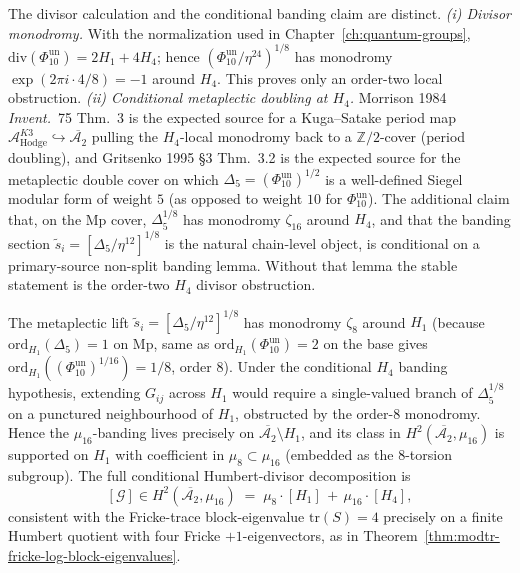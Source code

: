 \begin{remark}
\label{rem:modtr-mu16-why-mu8-fails}
The divisor calculation and the conditional banding claim are distinct.
\emph{(i) Divisor monodromy.} With the normalization used in
Chapter~\ref{ch:quantum-groups},
$\mathrm{div}(\Phi_{10}^{\mathrm{un}})=2H_1+4H_4$; hence
$(\Phi_{10}^{\mathrm{un}}/\eta^{24})^{1/8}$ has monodromy
$\exp(2\pi i\cdot4/8)=-1$ around $H_4$. This proves only an order-two
local obstruction.
\emph{(ii) Conditional metaplectic doubling at $H_4$.}
Morrison 1984 \emph{Invent.}~75 Thm.~3 is the expected source for a
Kuga--Satake
period map $\mathcal A^{K3}_{\mathrm{Hodge}}\hookrightarrow\overline{\mathcal A_2}$
pulling the $H_4$-local monodromy back to a $\mathbb Z/2$-cover (period
doubling), and Gritsenko 1995 \S3 Thm.~3.2 is the expected source for
the metaplectic double cover on which
$\Delta_5 = (\Phi_{10}^{\mathrm{un}})^{1/2}$ is a
well-defined Siegel modular form of weight $5$ (as opposed to weight
$10$ for $\Phi_{10}^{\mathrm{un}}$). The additional claim that, on the
Mp cover, $\Delta_5^{1/8}$ has monodromy
$\zeta_{16}$ around $H_4$, and that the banding section
$\widetilde s_i = [\Delta_5/\eta^{12}]^{1/8}$ is the natural
chain-level object, is conditional on a primary-source non-split
banding lemma. Without that lemma the stable statement is the order-two
$H_4$ divisor obstruction.
\end{remark}

\begin{remark}
\label{rem:modtr-mu16-H1-obstruction}
The metaplectic lift $\widetilde s_i = [\Delta_5/\eta^{12}]^{1/8}$ has
monodromy $\zeta_8$ around $H_1$ (because
$\mathrm{ord}_{H_1}(\Delta_5) = 1$ on Mp, same as
$\mathrm{ord}_{H_1}(\Phi_{10}^{\mathrm{un}}) = 2$
on the base gives
$\mathrm{ord}_{H_1}((\Phi_{10}^{\mathrm{un}})^{1/16}) = 1/8$, order
$8$). Under the conditional $H_4$ banding hypothesis, extending
$G_{ij}$ across $H_1$ would require a single-valued
branch of $\Delta_5^{1/8}$ on a punctured neighbourhood of $H_1$,
obstructed by the order-$8$ monodromy. Hence the $\mu_{16}$-banding
lives precisely on $\overline{\mathcal A_2}\setminus H_1$, and its
class in $H^2(\overline{\mathcal A_2},\mu_{16})$ is supported on
$H_1$ with coefficient in $\mu_8\subset\mu_{16}$ (embedded as the
$8$-torsion subgroup). The full conditional Humbert-divisor
decomposition is
\[
 [\mathcal G]\in H^2(\overline{\mathcal A_2},\mu_{16}) \;=\;
 \mu_8\cdot[H_1] \,+\, \mu_{16}\cdot[H_4],
\]
consistent with the Fricke-trace block-eigenvalue
\(\mathrm{tr}(S)=4\) precisely on a finite Humbert quotient with four
Fricke \(+1\)-eigenvectors, as in
Theorem~\ref{thm:modtr-fricke-log-block-eigenvalues}.
\end{remark}

